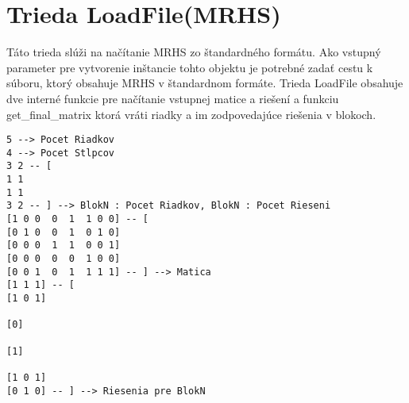 



\section{Trieda LoadFile(MRHS)}
Táto trieda slúži na načítanie MRHS zo štandardného formátu. Ako vstupný parameter pre vytvorenie inštancie tohto objektu je potrebné zadať cestu k súboru, ktorý obsahuje MRHS v štandardnom formáte. Trieda LoadFile obsahuje dve interné funkcie pre načítanie vstupnej matice a riešení a funkciu get\_final\_matrix ktorá vráti riadky a im zodpovedajúce riešenia v blokoch. \begin{lstlisting}[caption={Príklad vstupného textového súboru triedy LoadFile(file\_name)}, label={lst:subor}]
5 --> Pocet Riadkov
4 --> Pocet Stlpcov
3 2 -- [
1 1
1 1
3 2 -- ] --> BlokN : Pocet Riadkov, BlokN : Pocet Rieseni
[1 0 0  0  1  1 0 0] -- [
[0 1 0  0  1  0 1 0]
[0 0 0  1  1  0 0 1]
[0 0 0  0  0  1 0 0]
[0 0 1  0  1  1 1 1] -- ] --> Matica
[1 1 1] -- [
[1 0 1]

[0]

[1]

[1 0 1]
[0 1 0] -- ] --> Riesenia pre BlokN
\end{lstlisting}

